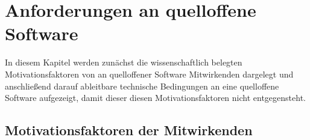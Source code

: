 \section{Anforderungen an quelloffene Software}\label{sec:anforderungen-an-quelloffene-software}

In diesem Kapitel werden zunächst die wissenschaftlich belegten Motivationsfaktoren von an quelloffener Software Mitwirkenden dargelegt und anschließend darauf ableitbare technische Bedingungen an eine quelloffene Software aufgezeigt, damit dieser diesen Motivationsfaktoren nicht entgegensteht.



\subsection{Motivationsfaktoren der Mitwirkenden}\label{subsec:motivationsfaktoren-der-mitwirkenden}

